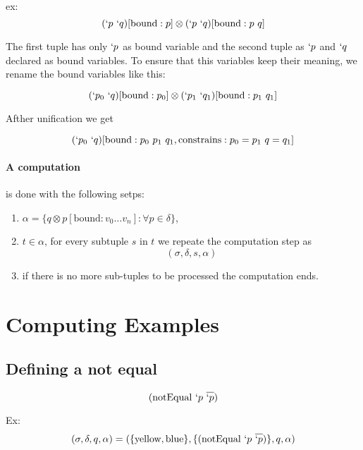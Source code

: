 \documentclass[11pt,a4paper]{report}
\newcommand{\var}[1]{`#1}
\newcommand{\unify}{\otimes}
\begin{document}
ex: 
\[
    (\var{p}\ \var{q})[\text{bound}: p] \unify (\var{p}\ \var{q})[\text{bound}: p\ q]
\]

The first tuple has only $\var{p}$ as bound variable and the second tuple as $\var{p}$ and $\var{q}$ declared as bound variables.
To ensure that this variables keep their meaning, we rename the bound variables like this:

\[
    (\var{p_{0}}\ \var{q})[\text{bound}: p_{0}] \unify (\var{p_{1}}\ \var{q_{1}})[\text{bound}: p_{1}\ q_{1}]
\]

Afther unification we get

\[
    (\var{p_{0}}\ \var{q})[\text{bound}: p_{0}\ p_{1}\ q_{1}, \text{constrains}: p_{0}=p_{1}\ q=q_{1}]
\]



\paragraph{A computation} is done with the following setps:

\begin{enumerate}
    \item $\alpha = \{q \unify p[\text{bound}: v_{0} \ldots v_{n}] :\forall p \in \delta\}$,
    \item $t \in \alpha$, for every subtuple $s$ in $t$ we repeate the computation step as
    \[(\sigma, \delta, s, \alpha)\]
    \item if there is no more sub-tuples to be processed the computation ends.
\end{enumerate}

\section{Computing Examples}

\subsection{Defining a not equal}

\[ 
    (\text{notEqual}\ \var{p}\ \overline{\var{p}})
\] 

Ex:
\[(\sigma, \delta, q, \alpha ) = (\{\text{yellow}, \text{blue}\}, \{(\text{notEqual}\ \var{p}\ \overline{\var{p}})\}, q, \alpha)\]
\end{document}
